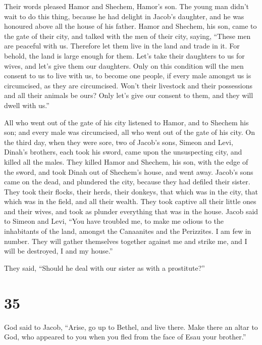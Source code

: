  Their words pleased Hamor and Shechem, Hamor's son.
 The young man didn't wait to do this thing, because he
had delight in Jacob's daughter, and he was honoured above all the house
of his father.  Hamor and Shechem, his son, came to the
gate of their city, and talked with the men of their city, saying,
 ``These men are peaceful with us. Therefore let them
live in the land and trade in it. For behold, the land is large enough
for them. Let's take their daughters to us for wives, and let's give
them our daughters.  Only on this condition will the men
consent to us to live with us, to become one people, if every male
amongst us is circumcised, as they are circumcised. 
Won't their livestock and their possessions and all their animals be
ours? Only let's give our consent to them, and they will dwell with
us.''

 All who went out of the gate of his city listened to
Hamor, and to Shechem his son; and every male was circumcised, all who
went out of the gate of his city.  On the third day, when
they were sore, two of Jacob's sons, Simeon and Levi, Dinah's brothers,
each took his sword, came upon the unsuspecting city, and killed all the
males.  They killed Hamor and Shechem, his son, with the
edge of the sword, and took Dinah out of Shechem's house, and went away.
 Jacob's sons came on the dead, and plundered the city,
because they had defiled their sister.  They took their
flocks, their herds, their donkeys, that which was in the city, that
which was in the field,  and all their wealth. They took
captive all their little ones and their wives, and took as plunder
everything that was in the house.  Jacob said to Simeon
and Levi, ``You have troubled me, to make me odious to the inhabitants
of the land, amongst the Canaanites and the Perizzites. I am few in
number. They will gather themselves together against me and strike me,
and I will be destroyed, I and my house.''

 They said, ``Should he deal with our sister as with a
prostitute?''

\hypertarget{section-34}{%
\section{35}\label{section-34}}

 God said to Jacob, ``Arise, go up to Bethel, and live
there. Make there an altar to God, who appeared to you when you fled
from the face of Esau your brother.''

